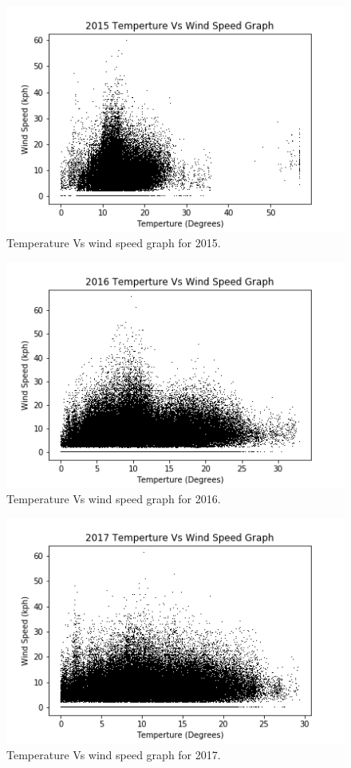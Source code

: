 \documentclass[12pt]{article}
\begin{document}
\begin{figure}[H]
\centering
\includegraphics[scale=1.0]{Graphs/2015_Temperture_Vs_Wind_Speed.png}
\caption{Temperature Vs wind speed graph for 2015.}
\label{Temperature Vs Wind Speed graph for 2015.}
\end{figure}

\begin{figure}[H]
\centering
\includegraphics[scale=1.0]{Graphs/2016_Temperture_Vs_Wind_Speed.png}
\caption{Temperature Vs wind speed graph for 2016.}
\label{Temperature Vs Wind Speed graph for 2016.}
\end{figure}

\begin{figure}[H]
\centering
\includegraphics[scale=1.0]{Graphs/2017_Temperture_Vs_Wind_Speed.png}
\caption{Temperature Vs wind speed graph for 2017.}
\label{Temperature Vs Wind Speed graph for 2017.}
\end{figure}
\end{document}
